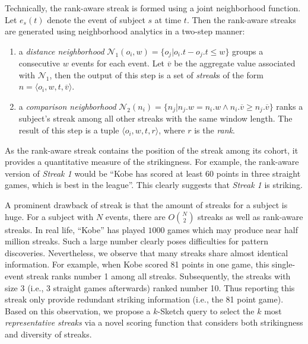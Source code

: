 Technically, the rank-aware streak is formed using a joint neighborhood function. 
Let $e_s(t)$ denote the event of subject $s$ at time $t$. Then the rank-aware streaks are generated using neighborhood analytics in a two-step manner: 

\begin{enumerate}
\item {a \emph{distance neighborhood} $\mathcal{N}_1(o_i,w)=\{o_j | o_i.t - o_j.t \leq w \}$ groups a consecutive $w$ events for each event. Let $\overline{v}$ be the aggregate value associated with $\mathcal{N}_1$, then the output of this step is a set of \emph{streak}s of the form  $n=\langle o_i, w, t, \overline{v} \rangle$.}
\item {a \emph{comparison neighborhood} $\mathcal{N}_2(n_i) = \{n_j | n_j.w = n_i.w \wedge n_i.\overline{v} \geq n_j.\overline{v} \}$ ranks a subject's streak among all other streaks with the same window length. The result of this step is a tuple $\langle o_i, w, t, r \rangle$, where $r$ is the \emph{rank}.}
\end{enumerate}
%
%

As the rank-aware streak contains the position of the streak among its cohort, it provides a quantitative measure of the strikingness.
For example, the rank-aware
version of \emph{Streak 1} would be ``Kobe has scored at least 60 points in three straight games, which is best in the league''.  This clearly suggests that \emph{Streak 1} is striking.
%

A prominent drawback of streak is that the amount of streaks
for a subject is huge. For a subject with $N$ events,
there are $O{N\choose 2}$ streaks as well as rank-aware streaks. 
In real life, ``Kobe'' has played $1000$ games which may produce near half million streaks.
Such a large number clearly poses difficulties for pattern discoveries.
Nevertheless, we observe that many streaks share almost identical information. For example, when Kobe scored 81 points
in one game, this single-event streak ranks number 1 among all streaks. Subsequently, the streaks with size 3 (i.e., 3 straight games afterwards) ranked number 10. Thus reporting this
streak only provide redundant striking information (i.e., the 81 point game).
Based on this observation, we
propose a $k$-Sketch query to select the $k$ most \emph{representative streaks} via a novel scoring function that considers both strikingness and diversity of streaks.
%

